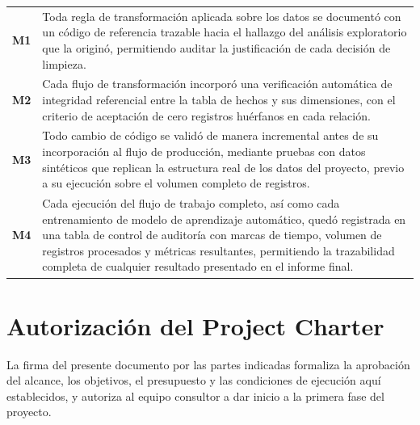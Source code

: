 \documentclass[12pt,a4paper]{article}
\begin{document}
\vspace{4pt}
{\small
\begin{tabular}{@{} >{\bfseries}p{0.6cm} p{13cm} @{}}
  M1 & Toda regla de transformación aplicada sobre los datos se documentó con un código de
       referencia trazable hacia el hallazgo del análisis exploratorio que la originó, permitiendo
       auditar la justificación de cada decisión de limpieza. \\[6pt]
  M2 & Cada flujo de transformación incorporó una verificación automática de integridad
       referencial entre la tabla de hechos y sus dimensiones, con el criterio de aceptación de
       cero registros huérfanos en cada relación. \\[6pt]
  M3 & Todo cambio de código se validó de manera incremental antes de su incorporación al
       flujo de producción, mediante pruebas con datos sintéticos que replican la estructura real
       de los datos del proyecto, previo a su ejecución sobre el volumen completo de registros. \\[6pt]
  M4 & Cada ejecución del flujo de trabajo completo, así como cada entrenamiento de modelo de
       aprendizaje automático, quedó registrada en una tabla de control de auditoría con marcas
       de tiempo, volumen de registros procesados y métricas resultantes, permitiendo la
       trazabilidad completa de cualquier resultado presentado en el informe final. \\
\end{tabular}
}

\newpage
\section{Autorización del Project Charter}

La firma del presente documento por las partes indicadas formaliza la aprobación del alcance,
los objetivos, el presupuesto y las condiciones de ejecución aquí establecidos, y autoriza al
equipo consultor a dar inicio a la primera fase del proyecto.

\vspace{32pt}
\end{document}

